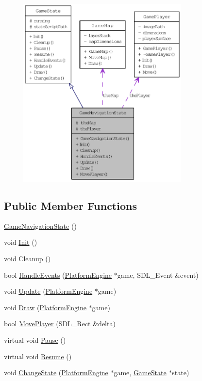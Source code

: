 \begin{figure}[H]
\begin{center}
\leavevmode
\includegraphics[width=244pt]{d1/d57/class_game_navigation_state__coll__graph}
\end{center}
\end{figure}
\subsection*{Public Member Functions}
\begin{CompactItemize}
\item 
\hyperlink{class_game_navigation_state_6a3b93831c85eb5dc3de0a53ca13ddfc}{GameNavigationState} ()
\item 
void \hyperlink{class_game_navigation_state_8f613860bf544476ab9cff9fb7f98201}{Init} ()
\item 
void \hyperlink{class_game_navigation_state_f93a7dbb7eac4b14a6d59cbca32b9abd}{Cleanup} ()
\item 
bool \hyperlink{class_game_navigation_state_6e7c13d35a33478673c62ae55394cfdc}{HandleEvents} (\hyperlink{class_platform_engine}{PlatformEngine} $\ast$game, SDL\_\-Event \&event)
\item 
void \hyperlink{class_game_navigation_state_90f5e6d6287a875d8f2737180f46a004}{Update} (\hyperlink{class_platform_engine}{PlatformEngine} $\ast$game)
\item 
void \hyperlink{class_game_navigation_state_a37dce070a906454c512192c067fda09}{Draw} (\hyperlink{class_platform_engine}{PlatformEngine} $\ast$game)
\item 
bool \hyperlink{class_game_navigation_state_40ef4ee4596f6e727e2f6bd7e2a352bf}{MovePlayer} (SDL\_\-Rect \&delta)
\item 
virtual void \hyperlink{class_game_state_0c47c6969a4e0bb32d6cdf7bf9376817}{Pause} ()
\item 
virtual void \hyperlink{class_game_state_d12ece3c3fb066281b73b07a315f04e8}{Resume} ()
\item 
void \hyperlink{class_game_state_f786aeb704a22a135dc289bb89fcc452}{ChangeState} (\hyperlink{class_platform_engine}{PlatformEngine} $\ast$game, \hyperlink{class_game_state}{GameState} $\ast$state)
\end{CompactItemize}
